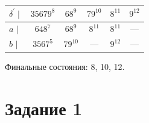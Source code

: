 \documentclass[fleqn,12pt, a4paper]{article}
\begin{document}
\begin{enumerate}[label=(\roman{*})]
	\vspace{1em}

	\begin{tabular}{lccccc}
		\toprule
		\multicolumn{1}{c}{
			$\delta^\prime \mid$
		}
		& \multicolumn{1}{c}{ $35679^8$ }
		& \multicolumn{1}{c}{ $68^9$ }
		& \multicolumn{1}{c}{ $79^{10}$ }
		& \multicolumn{1}{c}{ $8^{11}$ }
		& \multicolumn{1}{c}{ $9^{12}$ }

		\\
		\midrule

		$a$ $\mid$ &
		$648^{7}$ & $68^{9}$ & $8^{11}$ & $8^{11}$ & ---   \\
		$b$ $\mid$ & $3567^5$
		& $79^{10}$ &--- & $9^{12}$ & --- \\
		\bottomrule
	\end{tabular}
	
	Финальные состояния: 8, 10, 12.

\end{enumerate}

\section*{Задание 1}
\end{document}
